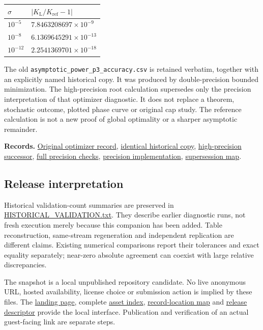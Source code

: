 \documentclass[11pt,a4paper]{article}
\begin{document}
\begin{longtable}[]{@{}ll@{}}
\toprule\noalign{}
\(\sigma\) & \(|K_{\mathrm{L}}/K_{\mathrm{ref}}-1|\) \\
\midrule\noalign{}
\endhead
\bottomrule\noalign{}
\endlastfoot
\(10^{-5}\) & \(7.8463208697\times10^{-9}\) \\
\(10^{-8}\) & \(6.1369645291\times10^{-13}\) \\
\(10^{-12}\) & \(2.2541369701\times10^{-18}\) \\
\end{longtable}

The old \texttt{asymptotic\_power\_p3\_accuracy.csv} is retained
verbatim, together with an explicitly named historical copy. It was
produced by double-precision bounded minimization. The high-precision
root calculation supersedes only the precision interpretation of that
optimizer diagnostic. It does not replace a theorem, stochastic outcome,
plotted phase curve or original cap study. The reference calculation is
not a new proof of global optimality or a sharper asymptotic remainder.

\textbf{Records.}
\href{../data/records/asymptotic_power_p3_accuracy.csv}{Original
optimizer record},
\href{../data/targeted_reference/power/historical_power_p3_accuracy.csv}{identical
historical copy},
\href{../data/targeted_reference/power/power_p3_successor.csv}{high-precision
successor},
\href{../data/targeted_reference/power/power_reference.json}{full
precision checks}, \href{../targeted/power_reference.py}{precision
implementation}, \href{../config/supersession.json}{supersession map}.

\subsection{Release interpretation}\label{c09-release}

Historical validation-count summaries are preserved in
\url{HISTORICAL_VALIDATION.txt}. They describe earlier diagnostic runs,
not fresh execution merely because this companion has been added. Table
reconstruction, same-stream regeneration and independent replication are
different claims. Existing numerical comparisons report their tolerances
and exact equality separately; near-zero absolute agreement can coexist
with large relative discrepancies.

The snapshot is a local unpublished repository candidate. No live
anonymous URL, hosted availability, license choice or submission action
is implied by these files. The \href{../index.html}{landing page},
complete \href{EVIDENCE_INDEX.md}{asset index},
\href{RECORD_LOCATIONS.md}{record-location map} and
\href{../RELEASE.json}{release descriptor} provide the local interface.
Publication and verification of an actual guest-facing link are separate
steps.
\end{document}

